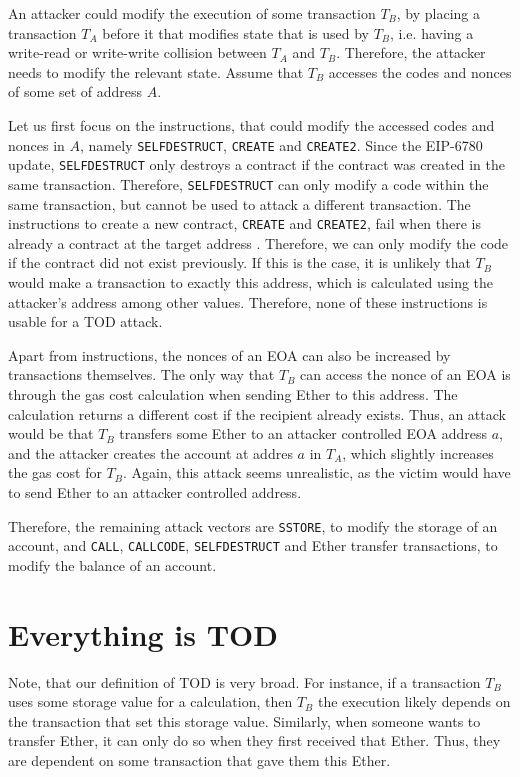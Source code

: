 \documentclass[draft,final]{vutinfth} %
\begin{document}
An attacker could modify the execution of some transaction $T_B$, by placing a transaction $T_A$ before it that modifies state that is used by $T_B$, i.e. having a write-read or write-write collision between $T_A$ and $T_B$. Therefore, the attacker needs to modify the relevant state.
Assume that $T_B$ accesses the codes and nonces of some set of address $A$.

Let us first focus on the instructions, that could modify the accessed codes and nonces in $A$, namely \verb|SELFDESTRUCT|, \verb|CREATE| and \verb|CREATE2|. Since the EIP-6780 update\cite{noauthor_eip-6780_nodate}, \verb|SELFDESTRUCT| only destroys a contract if the contract was created in the same transaction. Therefore, \verb|SELFDESTRUCT| can only modify a code within the same transaction, but cannot be used to attack a different transaction. The instructions to create a new contract, \verb|CREATE| and \verb|CREATE2|, fail when there is already a contract at the target address \cite{noauthor_evm_2024}. Therefore, we can only modify the code if the contract did not exist previously. If this is the case, it is unlikely that $T_B$ would make a transaction to exactly this address, which is calculated using the attacker's address among other values. Therefore, none of these instructions is usable for a TOD attack.

Apart from instructions, the nonces of an EOA can also be increased by transactions themselves. The only way that $T_B$ can access the nonce of an EOA is through the gas cost calculation when sending Ether to this address. The calculation returns a different cost if the recipient already exists. Thus, an attack would be that $T_B$ transfers some Ether to an attacker controlled EOA address $a$, and the attacker creates the account at addres $a$ in $T_A$, which slightly increases the gas cost for $T_B$. Again, this attack seems unrealistic, as the victim would have to send Ether to an attacker controlled address.

Therefore, the remaining attack vectors are \verb|SSTORE|, to modify the storage of an account, and \verb|CALL|, \verb|CALLCODE|, \verb|SELFDESTRUCT| and Ether transfer transactions, to modify the balance of an account.

\section{Everything is TOD}

Note, that our definition of TOD is very broad. For instance, if a transaction $T_B$ uses some storage value for a calculation, then $T_B$ the execution likely depends on the transaction that set this storage value. Similarly, when someone wants to transfer Ether, it can only do so when they first received that Ether. Thus, they are dependent on some transaction that gave them this Ether.
\end{document}
